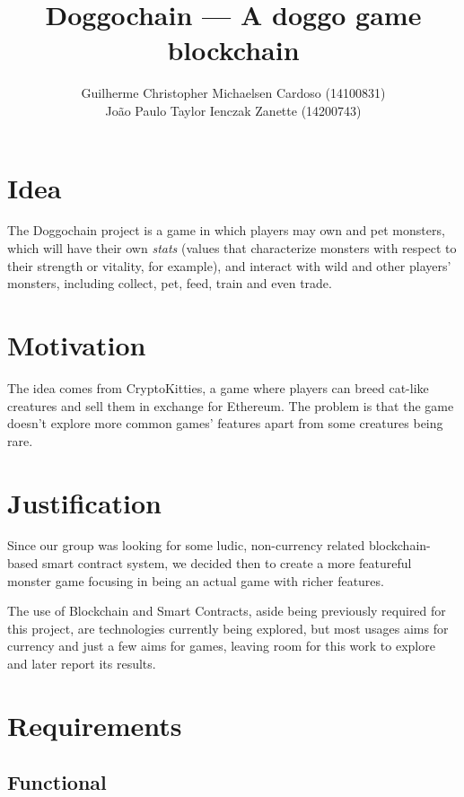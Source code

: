 \documentclass{article}
\title{Doggochain --- A doggo game blockchain}
\author{%
    Guilherme Christopher Michaelsen Cardoso (14100831) \\
    João Paulo Taylor Ienczak Zanette (14200743)
}
\begin{document}
    \maketitle

    \section{Idea}

    The Doggochain project is a game in which players may own and pet monsters,
    which will have their own \textit{stats} (values that characterize monsters
    with respect to their strength or vitality, for example), and interact with
    wild and other players' monsters, including collect, pet, feed, train and
    even trade.

    \section{Motivation}

    The idea comes from CryptoKitties, a game where players can breed cat-like
    creatures and sell them in exchange for Ethereum. The problem is that the
    game doesn't explore more common games' features apart from some creatures
    being rare.

    \section{Justification}

    Since our group was looking for some ludic, non-currency related
    blockchain-based smart contract system, we decided then to create a more
    featureful monster game focusing in being an actual game with richer
    features.

    The use of Blockchain and Smart Contracts, aside being previously required
    for this project, are technologies currently being explored, but most
    usages aims for currency and just a few aims for games, leaving room for
    this work to explore and later report its results.

    \section{Requirements}

    \subsection{Functional}
\end{document}
